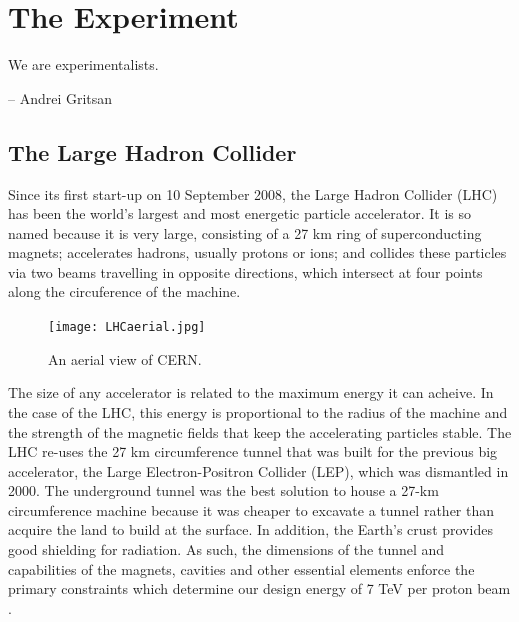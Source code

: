 \chapter{The Experiment} \label{chap:chap-3}


\epigraph{We are experimentalists.}{-- Andrei Gritsan}





\section{The Large Hadron Collider}


Since its first start-up on 10 September 2008, the Large Hadron Collider (LHC) has been the world’s largest and most energetic particle accelerator. It is so named because it is very large, consisting of a 27 km ring of superconducting magnets; accelerates hadrons, usually protons or ions; and collides these particles via two beams travelling in opposite directions, which intersect at four points along the circuference of the machine.

\begin{figure}[!ht]
    \begin{center}
        \texttt{[image: LHCaerial.jpg]}
        \caption{An aerial view of CERN.}
        \label{fig:LHCaerial}
    \end{center}
    \end{figure}

The size of any accelerator is related to the maximum energy it can acheive. 
In the case of the LHC, this energy is proportional to the radius of the
machine and the strength of the magnetic fields that keep the accelerating particles stable. 
The LHC re-uses the 27 km circumference tunnel that was built for the previous big accelerator, the Large Electron-Positron Collider (LEP), which was dismantled in 2000.
The underground tunnel was the best solution to house a 27-km circumference machine because it was cheaper to excavate a tunnel rather than acquire the land to build at the surface.
In addition, the Earth’s crust provides good shielding for radiation. 
As such, the dimensions of the tunnel and capabilities of the magnets, cavities and other essential elements enforce the primary constraints which determine our design energy of 7 TeV per proton beam \cite{CERNBroc79}. 

